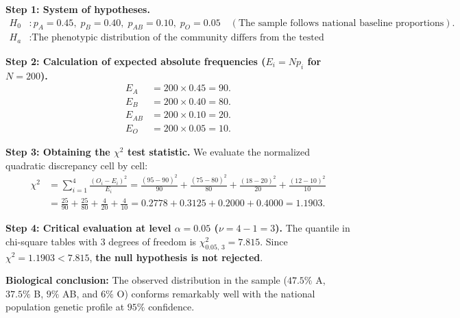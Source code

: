 \begin{solproblema}
	\textbf{Step 1: System of hypotheses.}
	\begin{align}
		H_0&: p_A = 0.45, \; p_B = 0.40, \; p_{AB} = 0.10, \; p_O = 0.05 \quad (\text{The sample follows national baseline proportions}). \\
		H_a&: \text{The phenotypic distribution of the community differs from the tested theoretical proportions.}
	\end{align}
	
	\textbf{Step 2: Calculation of expected absolute frequencies ($E_i = N p_i$ for $N = 200$).}
	\begin{align}
		E_A &= 200 \times 0.45 = 90. \\
		E_B &= 200 \times 0.40 = 80. \\
		E_{AB} &= 200 \times 0.10 = 20. \\
		E_O &= 200 \times 0.05 = 10.
	\end{align}
	
	\textbf{Step 3: Obtaining the $\chi^2$ test statistic.}
	We evaluate the normalized quadratic discrepancy cell by cell:
	\begin{align}
		\chi^2 &= \sum_{i=1}^4 \frac{(O_i - E_i)^2}{E_i} = \frac{(95-90)^2}{90} + \frac{(75-80)^2}{80} + \frac{(18-20)^2}{20} + \frac{(12-10)^2}{10} \\
		&= \frac{25}{90} + \frac{25}{80} + \frac{4}{20} + \frac{4}{10} = 0.2778 + 0.3125 + 0.2000 + 0.4000 = 1.1903.
	\end{align}
	
	\textbf{Step 4: Critical evaluation at level $\alpha = 0.05$ ($\nu = 4 - 1 = 3$).}
	The quantile in chi-square tables with 3 degrees of freedom is $\chi^2_{0.05, \, 3} = 7.815$.
	Since $\chi^2 = 1.1903 < 7.815$, \textbf{the null hypothesis is not rejected}.
	
	\textbf{Biological conclusion:} The observed distribution in the sample ($47.5\%$ A, $37.5\%$ B, $9\%$ AB, and $6\%$ O) conforms remarkably well with the national population genetic profile at $95\%$ confidence.
\end{solproblema}

